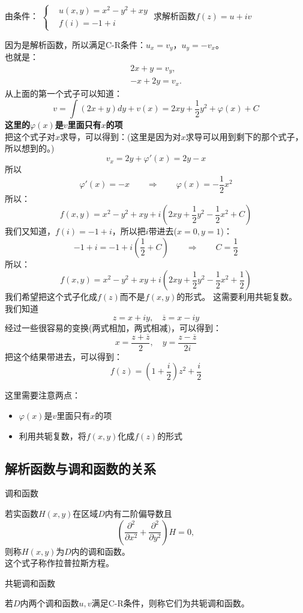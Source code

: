 \documentclass[cn,hazy,blue,14pt,normal]{elegantnote}
\numberwithin{equation}{section}
\begin{document}
\begin{example}
	由条件：
	$\left\{
	\begin{aligned}
		&u(x,y) = x^2-y^2+xy\\
		&f(i) = -1+i
		\end{aligned}
	\right.$
	求解析函数$f(z)=u+iv$
\end{example}
因为是解析函数，所以满足C-R条件：$u_x=v_y$，$u_y=-v_x$。\\
也就是：
\begin{gather*}
	2x+y=v_y,\\
	-x+2y=v_x.
\end{gather*}
从上面的第一个式子可以知道：
$$
v=\int (2x+y)dy + v(x) = 2xy+\frac{1}{2}y^2 + \varphi(x) + C
$$
\textbf{这里的$\varphi(x)$是$v$里面只有$x$的项}\\
把这个式子对$x$求导，可以得到：(这里是因为对$x$求导可以用到剩下的那个式子，所以想到的。)
$$
v_x=2y+\varphi'(x)=2y-x
$$
所以
$$
\varphi'(x)=-x\qquad\Rightarrow\qquad\varphi(x)=-\frac{1}{2}x^2
$$
所以：
$$
f(x,y)=x^2-y^2+xy+i(2xy+\frac{1}{2}y^2-\frac{1}{2}x^2+C)
$$
我们又知道，$f(i)=-1+i$，所以把$i$带进去($x=0,y=1$)：
$$
-1+i=-1+i(\frac12 + C) \qquad\Rightarrow\qquad C=\frac12
$$
所以：
$$
f(x,y)=x^2-y^2+xy+i(2xy+\frac{1}{2}y^2-\frac{1}{2}x^2+\frac12)
$$
我们希望把这个式子化成$f(z)$而不是$f(x,y)$的形式。
这需要利用共轭复数。\\
我们知道
$$
z=x+iy,\quad \overline{z}=x-iy
$$
经过一些很容易的变换(两式相加，两式相减)，可以得到：
$$
x=\frac{z+\overline{z}}{2},\quad y=\frac{z-\overline{z}}{2i}
$$
把这个结果带进去，可以得到：
$$
f(z)=(1+\frac i2)z^2+\frac i2
$$
\begin{note}
	这里需要注意两点：
	\begin{itemize}
		\item $\varphi(x)$是$v$里面只有$x$的项
		\item 利用共轭复数，将$f(x,y)$化成$f(z)$的形式
	\end{itemize}
\end{note}

\subsection{解析函数与调和函数的关系}
\begin{definition}
	调和函数
\end{definition}
若实函数$H(x,y)$在区域$D$内有二阶偏导数且
$$
(\frac{\partial^2}{\partial x^2} + \frac{\partial^2}{\partial y^2})H = 0,
$$
则称$H(x,y)$为$D$内的调和函数。\\
这个式子称作拉普拉斯方程。
\begin{definition}
	共轭调和函数
\end{definition}
若$D$内两个调和函数$u,v$满足C-R条件，则称它们为共轭调和函数。
\end{document}

